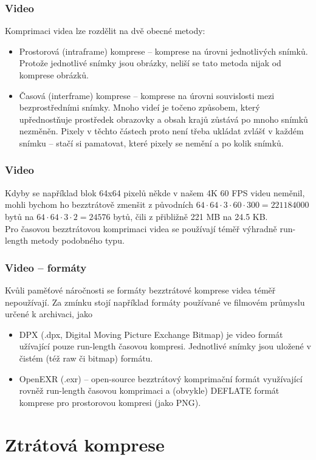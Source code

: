 \documentclass[aspectratio=169,11pt,svgnames]{beamer}
\begin{document}
\begin{frame}
 \frametitle{Video}
 Komprimaci videa lze rozdělit na dvě obecné metody:
 \begin{itemize}[label=\textbullet]
  \item \alert{Prostorová} (intraframe) komprese -- komprese na úrovni
   jednotlivých snímků. Protože jednotlivé snímky jsou obrázky, neliší se tato
   metoda nijak od komprese obrázků.
  \pause
 \item \alert{Časová} (interframe) komprese -- komprese na úrovni souvislosti
  mezi bezprostředními snímky. Mnoho videí je točeno způsobem, který
  upřednostňuje prostředek obrazovky a obsah krajů zůstává po mnoho snímků
  nezměněn. \pause
  Pixely v těchto částech proto není třeba ukládat zvlášť v každém snímku --
  stačí si pamatovat, které pixely se nemění a po kolik snímků.
 \end{itemize}
\end{frame}

\begin{frame}
 \frametitle{Video}
 Kdyby se například blok 64x64 pixelů někde v našem 4K 60 FPS videu neměnil,
 mohli bychom ho bezztrátově zmenšit z původních $64 \cdot 64 \cdot 3 \cdot 60
 \cdot 300 = 221184000$ bytů na $64 \cdot 64 \cdot 3 \cdot 2 = 24576$ bytů, čili
 z přibližně 221 MB na 24.5 KB.\pause\\
 Pro \alert{časovou} bezztrátovou komprimaci videa se používají téměř výhradně
 run-length metody podobného typu.
\end{frame}

\begin{frame}
 \frametitle{Video -- formáty}
 Kvůli paměťové náročnosti se formáty bezztrátové komprese videa téměř
 nepoužívají. \pause Za zmínku stojí například formáty používané ve filmovém
 průmyslu určené k archivaci, jako
 \begin{itemize}[label=\textbullet]
  \item \alert{DPX} (.dpx, Digital Moving Picture Exchange Bitmap) je video
   formát užívající pouze run-length časovou kompresi. Jednotlivé snímky jsou
   uložené v čistém (též raw či bitmap) formátu.
   \pause
  \item \alert{OpenEXR} (.exr) -- open-source bezztrátový komprimační formát
   využívající rovněž run-length časovou komprimaci a (obvykle) DEFLATE formát
   komprese pro prostorovou kompresi (jako PNG).
 \end{itemize}
\end{frame}

\section{Ztrátová komprese}
\label{sec:ztratova-komprese}
\end{document}
